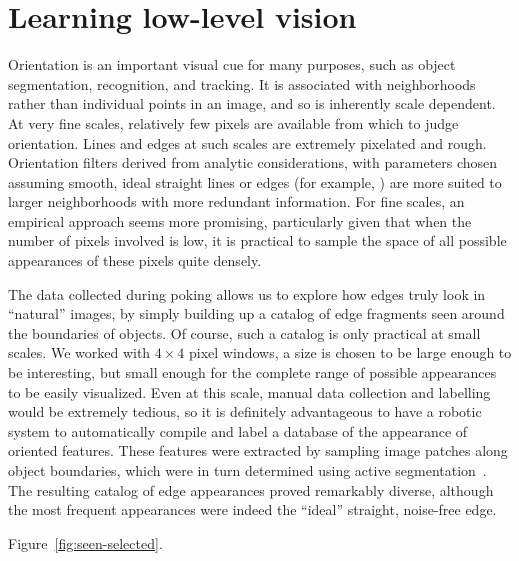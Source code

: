 

\section{Learning low-level vision}

Orientation is an important visual cue for many purposes, such as
object segmentation, recognition, and tracking.  It is associated with
neighborhoods rather than individual points in an image, and so is
inherently scale dependent.  At very fine scales, relatively few
pixels are available from which to judge orientation.
Lines and edges at such scales are extremely pixelated and
rough.
%
Orientation filters derived from analytic considerations, with
parameters chosen assuming smooth, ideal straight lines or edges (for
example, \cite{chen00orientation}) are more suited to larger
neighborhoods with more redundant information.
For fine scales, an empirical approach seems more promising, particularly
given that when the number of pixels involved is low, it is practical
to sample the space of all possible appearances of these pixels 
quite densely.

The data collected during poking allows us to explore how edges truly
look in ``natural'' images, by simply building up a catalog of edge
fragments seen around the boundaries of objects.  Of course, such a
catalog is only practical at small scales.  We worked with $4\times 4$
pixel windows, a size is chosen to be large enough to be interesting,
but small enough for the complete range of possible appearances to be
easily visualized.  Even at this scale, manual data collection and
labelling would be extremely tedious, so it is definitely advantageous
to have a robotic system to automatically compile and label a database
of the appearance of oriented features.
%
These features were extracted by sampling image patches
along object boundaries, which were in turn determined 
using active segmentation~\cite{fitzpatrick03first}.
The resulting catalog of edge appearances proved remarkably
diverse, although the most frequent appearances were indeed
the ``ideal'' straight, noise-free edge.

Figure~\ref{fig:seen-selected}.

